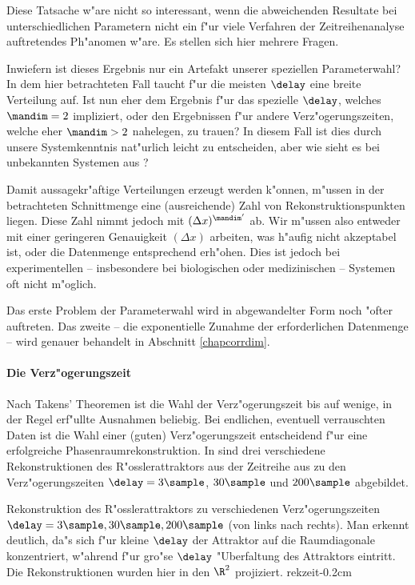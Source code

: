 Diese Tatsache w"are nicht so interessant, wenn die abweichenden Resultate bei
unterschiedlichen Parametern nicht ein f"ur viele Verfahren der Zeitreihenanalyse
auftretendes Ph"anomen w"are. Es stellen sich hier mehrere Fragen.
\begin{myitemize}
\item Inwiefern ist dieses Ergebnis nur ein Artefakt unserer speziellen Parameterwahl? In
  dem hier betrachteten Fall taucht f"ur die meisten $\delay$ eine breite Verteilung auf.
  Ist nun eher dem Ergebnis f"ur das spezielle $\delay$, welches $\mandim=2$ impliziert,
  oder den Ergebnissen f"ur andere Verz"ogerungszeiten, welche eher $\mandim>2$ nahelegen,
  zu trauen? In diesem Fall ist dies durch unsere Systemkenntnis nat"urlich leicht zu
  entscheiden, aber wie sieht es bei unbekannten Systemen aus ?
\item Damit aussagekr"aftige Verteilungen erzeugt werden k"onnen, m"ussen in der
  betrachteten Schnittmenge eine \naja(ausreichende) Zahl von Rekonstruktionspunkten
  liegen. Diese Zahl nimmt jedoch mit $(\Delta x)^{\mandim'}$ ab. Wir m"ussen also
  entweder mit einer geringeren Genauigkeit $(\Delta x)$ arbeiten, was h"aufig nicht
  akzeptabel ist, oder die Datenmenge entsprechend erh"ohen. Dies ist jedoch bei
  experimentellen -- insbesondere bei biologischen oder medizinischen -- Systemen oft
  nicht m"oglich.
\end{myitemize}

Das erste Problem der Parameterwahl wird in abgewandelter Form noch "ofter auftreten. Das
zweite -- die exponentielle Zunahme der erforderlichen Datenmenge -- wird genauer
behandelt in Abschnitt \ref{chapcorrdim}.

\paragraph{Die Verz"ogerungszeit}
\label{chapdelay}

Nach Takens' Theoremen ist die Wahl der Verz"ogerungszeit bis auf wenige, in der Regel
erf"ullte Ausnahmen beliebig. Bei endlichen, eventuell verrauschten Daten ist die Wahl
einer \naja(guten) Verz"ogerungszeit entscheidend f"ur eine erfolgreiche
Phasenraumrekonstruktion. In  sind drei verschiedene Rekonstruktionen des
R"osslerattraktors aus der Zeitreihe aus  zu den Verz"ogerungszeiten
$\delay=3\sample$, $30\sample$ und $200\sample$ abgebildet.

 {Rekonstruktion des
  R"osslerattraktors zu verschiedenen Verz"ogerungszeiten $\delay=3\sample, 30\sample,
  200\sample$ (von links nach rechts). Man erkennt deutlich, da"s sich f"ur kleine
  $\delay$ der Attraktor auf die Raumdiagonale konzentriert, w"ahrend f"ur gro"se $\delay$
  "Uberfaltung des Attraktors eintritt. Die Rekonstruktionen wurden hier in den $\R^2$
  projiziert.  }{rekzeit}{-0.2cm}

